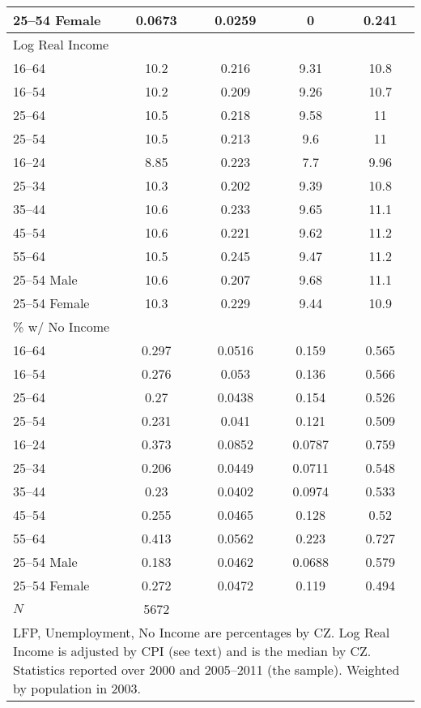 {\begin{tabular}{l*{1}{cccc}}
25--54 Female &      0.0673&      0.0259&           0&       0.241\\
\hline\hline
\multicolumn{5}{l}{Log Real Income}\\
\hline\hline
16--64 &        10.2&       0.216&        9.31&        10.8\\
16--54 &        10.2&       0.209&        9.26&        10.7\\
25--64 &        10.5&       0.218&        9.58&          11\\
25--54 &        10.5&       0.213&         9.6&          11\\
\hline
16--24 &        8.85&       0.223&         7.7&        9.96\\
25--34 &        10.3&       0.202&        9.39&        10.8\\
35--44 &        10.6&       0.233&        9.65&        11.1\\
45--54 &        10.6&       0.221&        9.62&        11.2\\
55--64 &        10.5&       0.245&        9.47&        11.2\\
\hline
25--54 Male &        10.6&       0.207&        9.68&        11.1\\
25--54 Female &        10.3&       0.229&        9.44&        10.9\\
\hline\hline
\multicolumn{5}{l}{\% w/ No Income}\\
\hline\hline
16--64 &       0.297&      0.0516&       0.159&       0.565\\
16--54 &       0.276&       0.053&       0.136&       0.566\\
25--64 &        0.27&      0.0438&       0.154&       0.526\\
25--54 &       0.231&       0.041&       0.121&       0.509\\
\hline
16--24 &       0.373&      0.0852&      0.0787&       0.759\\
25--34 &       0.206&      0.0449&      0.0711&       0.548\\
35--44 &        0.23&      0.0402&      0.0974&       0.533\\
45--54 &       0.255&      0.0465&       0.128&        0.52\\
55--64 &       0.413&      0.0562&       0.223&       0.727\\
\hline
25--54 Male &       0.183&      0.0462&      0.0688&       0.579\\
25--54 Female &       0.272&      0.0472&       0.119&       0.494\\
\hline\hline
\(N\)       &        5672&            &            &            \\
\hline\hline
\multicolumn{5}{p{0.4\textwidth}}{LFP, Unemployment, No Income are percentages by CZ\@.  Log Real Income is adjusted by CPI (see text) and is the median by CZ\@.  Statistics reported over 2000 and 2005--2011 (the sample).  Weighted by population in 2003.}
\end{tabular}
}
